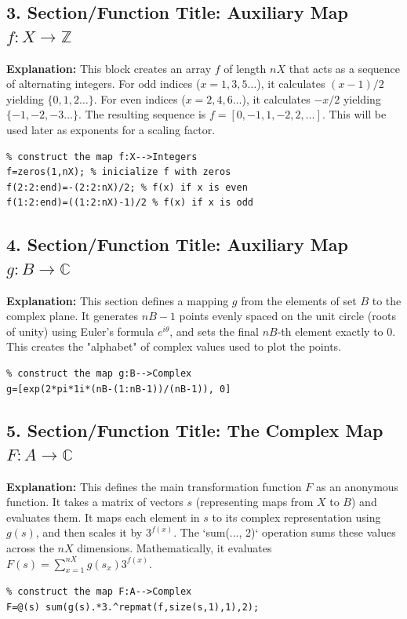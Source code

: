 \subsection{3. Section/Function Title: Auxiliary Map $f: X \to \mathbb{Z}$}
\textbf{Explanation:} This block creates an array $f$ of length $nX$ that acts as a sequence of alternating integers. For odd indices ($x=1, 3, 5 \dots$), it calculates $(x-1)/2$ yielding $\{0, 1, 2 \dots\}$. For even indices ($x=2, 4, 6 \dots$), it calculates $-x/2$ yielding $\{-1, -2, -3 \dots\}$. The resulting sequence is $f = [0, -1, 1, -2, 2, \dots]$. This will be used later as exponents for a scaling factor.
\begin{lstlisting}
% construct the map f:X-->Integers
f=zeros(1,nX); % inicialize f with zeros
f(2:2:end)=-(2:2:nX)/2; % f(x) if x is even
f(1:2:end)=((1:2:nX)-1)/2 % f(x) if x is odd
\end{lstlisting}


\subsection{4. Section/Function Title: Auxiliary Map $g: B \to \mathbb{C}$}
\textbf{Explanation:} This section defines a mapping $g$ from the elements of set $B$ to the complex plane. It generates $nB-1$ points evenly spaced on the unit circle (roots of unity) using Euler's formula $e^{i\theta}$, and sets the final $nB$-th element exactly to $0$. This creates the "alphabet" of complex values used to plot the points.
\begin{lstlisting}
% construct the map g:B-->Complex
g=[exp(2*pi*1i*(nB-(1:nB-1))/(nB-1)), 0]
\end{lstlisting}


\subsection{5. Section/Function Title: The Complex Map $F: A \to \mathbb{C}$}
\textbf{Explanation:} This defines the main transformation function $F$ as an anonymous function. It takes a matrix of vectors $s$ (representing maps from $X$ to $B$) and evaluates them. It maps each element in $s$ to its complex representation using $g(s)$, and then scales it by $3^{f(x)}$. The `sum(..., 2)` operation sums these values across the $nX$ dimensions. Mathematically, it evaluates $F(s) = \sum_{x=1}^{nX} g(s_x) 3^{f(x)}$.
\begin{lstlisting}
% construct the map F:A-->Complex
F=@(s) sum(g(s).*3.^repmat(f,size(s,1),1),2);
\end{lstlisting}


